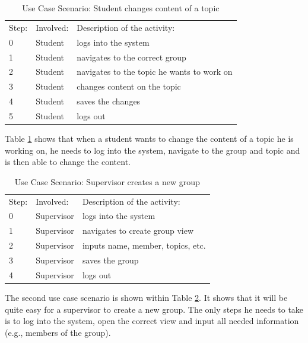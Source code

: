  \begin{table}[h]
\scriptsize
 \caption{Use Case Scenario: Student changes content of a topic}
 \begin{tabular}{lll}
	\toprule
  Step: & Involved: & Description of the activity: \\ 
\cmidrule(rl){1-1}\cmidrule(rl){2-2}\cmidrule(rl){3-3}
  	0 	& Student & logs into the system \\
	1	& Student & navigates to the correct group \\
	2	& Student & navigates to the topic he wants to work on \\
	3	& Student & changes content on the topic \\
	4	& Student & saves the changes \\	
	5	& Student & logs out \\
	\bottomrule
 \end{tabular}
 \label{tab:ucTopicChange}
 \end{table} 

Table \ref{tab:ucTopicChange} shows that when a student wants to change the content of a topic he is working on, he needs to log into the system, navigate to the group and topic and is then able to change the content.
 
 \begin{table}[h]
\scriptsize
 \caption{Use Case Scenario: Supervisor creates a new group}
 \begin{tabular}{lll}
	\toprule
  Step: & Involved: & Description of the activity: \\ 
\cmidrule(rl){1-1}\cmidrule(rl){2-2}\cmidrule(rl){3-3}
  	0 	& Supervisor & logs into the system \\
	1	& Supervisor & navigates to create group view \\
	2	& Supervisor & inputs name, member, topics, etc. \\
	3	& Supervisor & saves the group \\	
	4	& Supervisor & logs out \\
	\bottomrule
 \end{tabular}
 \label{tab:ucGroupCreation}
 \end{table} 

The second use case scenario is shown within Table \ref{tab:ucGroupCreation}. It shows that it will be quite easy for a supervisor to create a new group. The only steps he needs to take is to log into the system, open the correct view and input all needed information (e.g., members of the group). 

